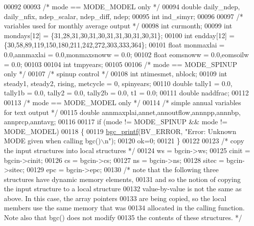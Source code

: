 \begin{DoxyCode}
00092 
00093     \textcolor{comment}{/* mode == MODE\_MODEL only */}
00094     \textcolor{keywordtype}{double} daily\_ndep, daily\_nfix, ndep\_scalar, ndep\_diff, ndep;
00095     \textcolor{keywordtype}{int} ind\_simyr;
00096     
00097     \textcolor{comment}{/* variables used for monthly average output */}
00098     \textcolor{keywordtype}{int} curmonth;
00099     \textcolor{keywordtype}{int} mondays[12] = \{31,28,31,30,31,30,31,31,30,31,30,31\};
00100     \textcolor{keywordtype}{int} endday[12] = \{30,58,89,119,150,180,211,242,272,303,333,364\};
00101     \textcolor{keywordtype}{float} monmaxlai = 0.0,annmaxlai = 0.0,monmaxsnoww = 0.0;
00102     \textcolor{keywordtype}{float} eomsnoww = 0.0,eomsoilw = 0.0;
00103 
00104     \textcolor{keywordtype}{int} tmpyears;
00105 
00106     \textcolor{comment}{/* mode == MODE\_SPINUP only */}
00107     \textcolor{comment}{/* spinup control */}
00108     \textcolor{keywordtype}{int} ntimesmet, nblock;
00109     \textcolor{keywordtype}{int} steady1, steady2, rising, metcycle = 0, spinyears;
00110     \textcolor{keywordtype}{double} tally1 = 0.0, tally1b = 0.0, tally2 = 0.0, tally2b = 0.0, t1 = 0.0;
00111     \textcolor{keywordtype}{double} naddfrac;
00112     
00113     \textcolor{comment}{/* mode == MODE\_MODEL only */}
00114     \textcolor{comment}{/* simple annual variables for text output */}
00115     \textcolor{keywordtype}{double} annmaxplai,annet,annoutflow,annnpp,annnbp, annprcp,anntavg;
00116 
00117     \textcolor{keywordflow}{if} (mode != MODE\_SPINUP && mode != MODE\_MODEL)
00118     \{
00119         \hyperlink{bgc__io_8c_af287cce6e2aede1ce337de9319e80d0d}{bgc\_printf}(BV\_ERROR, \textcolor{stringliteral}{"Error: Unknown MODE given when calling bgc()\(\backslash\)n"});
00120         ok=0;
00121     \}
00122     
00123     \textcolor{comment}{/* copy the input structures into local structures */}
00124     ws = bgcin->ws;
00125     cinit = bgcin->cinit;
00126     cs = bgcin->cs;
00127     ns = bgcin->ns;
00128     sitec = bgcin->sitec;
00129     epc = bgcin->epc;
00130     \textcolor{comment}{/* note that the following three structures have dynamic memory elements,}
00131 \textcolor{comment}{    and so the notion of copying the input structure to a local structure}
00132 \textcolor{comment}{    value-by-value is not the same as above. In this case, the array pointers}
00133 \textcolor{comment}{    are being copied, so the local members use the same memory that was}
00134 \textcolor{comment}{    allocated in the calling function. Note also that bgc() does not modify}
00135 \textcolor{comment}{    the contents of these structures. */}

\end{DoxyCode}
